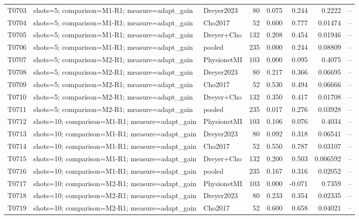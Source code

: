 \begin{longtable}{p{.45in}p{2.6in}p{.75in}rrrrr}
T0703 & shots=5; comparison=M1-R1; measure=adapt\_\allowbreak{}gain & Dreyer2023 & 80 & 0.075 & 0.244 & 0.2222 & -- \\
T0704 & shots=5; comparison=M1-R1; measure=adapt\_\allowbreak{}gain & Cho2017 & 52 & 0.600 & 0.777 & 0.01474 & -- \\
T0705 & shots=5; comparison=M1-R1; measure=adapt\_\allowbreak{}gain & Dreyer+Cho & 132 & 0.208 & 0.454 & 0.01946 & -- \\
T0706 & shots=5; comparison=M1-R1; measure=adapt\_\allowbreak{}gain & pooled & 235 & 0.000 & 0.244 & 0.08809 & -- \\
T0707 & shots=5; comparison=M2-R1; measure=adapt\_\allowbreak{}gain & PhysionetMI & 103 & 0.000 & 0.095 & 0.4075 & -- \\
T0708 & shots=5; comparison=M2-R1; measure=adapt\_\allowbreak{}gain & Dreyer2023 & 80 & 0.217 & 0.366 & 0.06695 & -- \\
T0709 & shots=5; comparison=M2-R1; measure=adapt\_\allowbreak{}gain & Cho2017 & 52 & 0.530 & 0.494 & 0.06666 & -- \\
T0710 & shots=5; comparison=M2-R1; measure=adapt\_\allowbreak{}gain & Dreyer+Cho & 132 & 0.350 & 0.417 & 0.01708 & -- \\
T0711 & shots=5; comparison=M2-R1; measure=adapt\_\allowbreak{}gain & pooled & 235 & 0.017 & 0.276 & 0.03928 & -- \\
T0712 & shots=10; comparison=M1-R1; measure=adapt\_\allowbreak{}gain & PhysionetMI & 103 & 0.106 & 0.076 & 0.4034 & -- \\
T0713 & shots=10; comparison=M1-R1; measure=adapt\_\allowbreak{}gain & Dreyer2023 & 80 & 0.092 & 0.318 & 0.06541 & -- \\
T0714 & shots=10; comparison=M1-R1; measure=adapt\_\allowbreak{}gain & Cho2017 & 52 & 0.550 & 0.787 & 0.03107 & -- \\
T0715 & shots=10; comparison=M1-R1; measure=adapt\_\allowbreak{}gain & Dreyer+Cho & 132 & 0.200 & 0.503 & 0.006592 & -- \\
T0716 & shots=10; comparison=M1-R1; measure=adapt\_\allowbreak{}gain & pooled & 235 & 0.167 & 0.316 & 0.02052 & -- \\
T0717 & shots=10; comparison=M2-R1; measure=adapt\_\allowbreak{}gain & PhysionetMI & 103 & 0.000 & -0.071 & 0.7359 & -- \\
T0718 & shots=10; comparison=M2-R1; measure=adapt\_\allowbreak{}gain & Dreyer2023 & 80 & 0.233 & 0.354 & 0.02335 & -- \\
T0719 & shots=10; comparison=M2-R1; measure=adapt\_\allowbreak{}gain & Cho2017 & 52 & 0.600 & 0.658 & 0.04021 & -- \\

\end{longtable}
